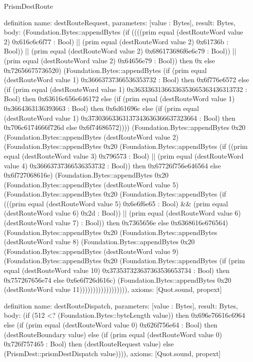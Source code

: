 \begin{lexlean}{PrismDestRoute}
\begin{semanticmodule}
definition{
  name: destRouteRequest,
  parameters: [value : Bytes],
  result: Bytes,
  body: (Foundation.Bytes::appendBytes (if ((((prim equal (destRouteWord value 2) 0x616c6c6f77 : Bool) || (prim equal (destRouteWord value 2) 0x61736b : Bool)) || (prim equal (destRouteWord value 2) 0x686173686f6e6c79 : Bool)) || (prim equal (destRouteWord value 2) 0x64656e79 : Bool)) then 0x else 0x72656675736520) (Foundation.Bytes::appendBytes (if (prim equal (destRouteWord value 1) 0x36663737366536353732 : Bool) then 0x6f776e6572 else (if (prim equal (destRouteWord value 1) 0x36333631366336353665363436313732 : Bool) then 0x63616c656e646172 else (if (prim equal (destRouteWord value 1) 0x3664363136393663 : Bool) then 0x6d61696c else (if (prim equal (destRouteWord value 1) 0x37303663363137343636366637323664 : Bool) then 0x706c6174666f726d else 0x6f74686572)))) (Foundation.Bytes::appendBytes 0x20 (Foundation.Bytes::appendBytes (destRouteWord value 2) (Foundation.Bytes::appendBytes 0x20 (Foundation.Bytes::appendBytes (if ((prim equal (destRouteWord value 3) 0x796573 : Bool) || (prim equal (destRouteWord value 4) 0x36663737366536353732 : Bool)) then 0x67726f756e646564 else 0x6f727068616e) (Foundation.Bytes::appendBytes 0x20 (Foundation.Bytes::appendBytes (destRouteWord value 5) (Foundation.Bytes::appendBytes 0x20 (Foundation.Bytes::appendBytes (if (((prim equal (destRouteWord value 5) 0x6e6f6e65 : Bool) && (prim equal (destRouteWord value 6) 0x2d : Bool)) || (prim equal (destRouteWord value 6) (destRouteWord value 7) : Bool)) then 0x7365656e else 0x6368616e676564) (Foundation.Bytes::appendBytes 0x20 (Foundation.Bytes::appendBytes (destRouteWord value 8) (Foundation.Bytes::appendBytes 0x20 (Foundation.Bytes::appendBytes (destRouteWord value 9) (Foundation.Bytes::appendBytes 0x20 (Foundation.Bytes::appendBytes (if (prim equal (destRouteWord value 10) 0x373537323637363536653734 : Bool) then 0x757267656e74 else 0x6e6f726d616c) (Foundation.Bytes::appendBytes 0x20 (destRouteWord value 11)))))))))))))))))),
  axioms: [Quot.sound, propext]
}

definition{
  name: destRouteDispatch,
  parameters: [value : Bytes],
  result: Bytes,
  body: (if (512 <? (Foundation.Bytes::byteLength value)) then 0x696e76616c6964 else (if (prim equal (destRouteWord value 0) 0x626f756e64 : Bool) then (destRouteBoundary value) else (if (prim equal (destRouteWord value 0) 0x726f757465 : Bool) then (destRouteRequest value) else (PrismDest::prismDestDispatch value)))),
  axioms: [Quot.sound, propext]
}
\end{semanticmodule}
\end{lexlean}

